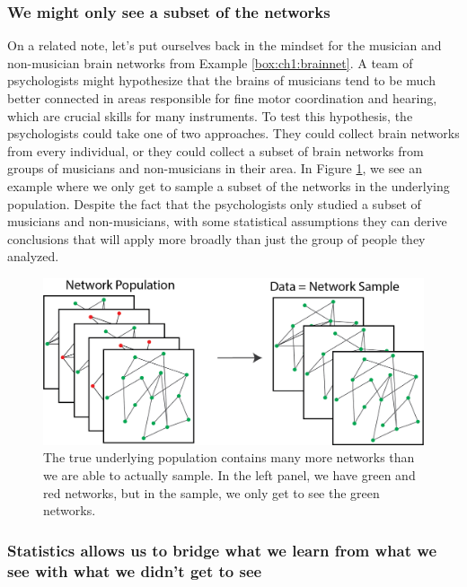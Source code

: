 \subsubsection{We might only see a subset of the networks}

On a related note, let's put ourselves back in the mindset for the musician and non-musician brain networks from Example \ref{box:ch1:brainnet}. A team of psychologists might hypothesize that the brains of musicians tend to be much better connected in areas responsible for fine motor coordination and hearing, which are crucial skills for many instruments. To test this hypothesis, the psychologists could take one of two approaches. They could collect brain networks from every individual, or they could collect a subset of brain networks from groups of musicians and non-musicians in their area. In Figure \ref{fig:ch1:many_nets_ss}, we see an example where we only get to sample a subset of the networks in the underlying population. Despite the fact that the psychologists only studied a subset of musicians and non-musicians, with some statistical assumptions they can derive conclusions that will apply more broadly than just the group of people they analyzed.

\begin{figure}[h]
    \centering
    \includegraphics[width=0.7\linewidth]{foundations/ch1/Images/many_networks.png}
    \caption[Only see subset of networks]{The true underlying population contains many more networks than we are
able to actually sample. In the left panel, we have green and red
networks, but in the sample, we only get to see the green networks.}
    \label{fig:ch1:many_nets_ss}
\end{figure}

\subsubsection{Statistics allows us to bridge what we learn from what we see with what we didn't get to see}

